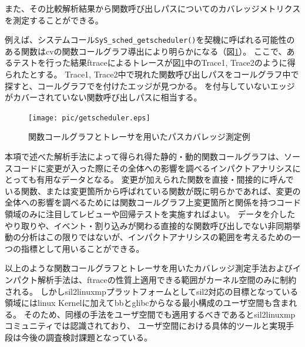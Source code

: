 また、その比較解析結果から関数呼び出しパスについてのカバレッジメトリクスを測定することができる。
\par
例えば、システムコール\verb|SyS_sched_getscheduler()|を契機に呼ばれる可能性のある関数は\acrshort{cv}の関数コールグラフ導出により明らかになる（図\ref{getscheduler}）。
ここで、あるテストを行った結果\acrshort{ftrace}によるトレースが図\ref{getscheduler}中のTrace1, Trace2のように得られたとする。
Trace1, Trace2中で現れた関数呼び出しパスをコールグラフ中で探すと、コールグラフで\checkmark{}を付けたエッジが見つかる。
\checkmark{}を付与していないエッジがカバーされていない関数呼び出しパスに相当する。
\begin{figure}[ht]
  \centering
  \texttt{[image: pic/getscheduler.eps]}
  \caption{関数コールグラフとトレーサを用いたパスカバレッジ測定例}
  \label{getscheduler}
\end{figure}
\par
本項で述べた解析手法によって得られ得た静的・動的関数コールグラフは、ソースコードに変更が入った際にその全体への影響を調べるインパクトアナリシスにとっても有用なデータとなる。
変更が加えられた関数を直接・間接的に呼んでいる関数、または変更箇所から呼ばれている関数が既に明らかであれば、変更の全体への影響を調べるためには関数コールグラフ上変更箇所と関係を持つコード領域のみに注目してレビューや回帰テストを実施すればよい。
データを介したやり取りや、イベント・割り込みが関わる直接的な関数呼び出しでない非同期挙動の分析はこの限りではないが、インパクトアナリシスの範囲を考えるための一つの指標として用いることができる。
\par
以上のような関数コールグラフとトレーサを用いたカバレッジ測定手法およびインパクト解析手法は、\acrshort{ftrace}の性質上適用できる範囲がカーネル空間のみに制約される。
しかし\acrshort{sil2linuxmp}プラットフォームとして\acrshort{sil2}対応の目標となっている領域には\acrshort{linux} Kernelに加えて\acrshort{bb}と\acrshort{glibc}からなる最小構成のユーザ空間も含まれる。
そのため、同様の手法をユーザ空間でも適用するべきであると\acrshort{sil2linuxmp}コミュニティでは認識されており、
ユーザ空間における具体的ツールと実現手段は今後の調査検討課題となっている。
